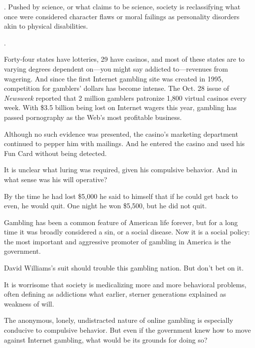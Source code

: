 \linefill. Pushed by science, or what claims to be science,
society is reclassifying what once were considered character flaws or
moral failings as personality disorders akin to physical disabilities.

\linefill.

Forty-four states have lotteries, 29 have casinos, and most of these
states are to varying degrees dependent on---you might say addicted
to---revenues from wagering. And since the first Internet gambling site
was created in 1995, competition for gamblers' dollars has become
intense. The Oct. 28 issue of \emph{Newsweek} reported that 2 million
gamblers patronize 1,800 virtual casinos every week. With \$3.5
billion being lost on Internet wagers this year, gambling has passed
pornography as the Web's most profitable business.
\begin{listmatch}
	\item
Although no such evidence was presented, the casino's marketing
department continued to pepper him with mailings. And he entered the
casino and used his Fun Card without being detected.


\item 
It is unclear what luring was required, given his compulsive
behavior. And in what sense was his will operative?


\item 
By the time he had lost \$5,000 he said to himself that if he
could get back to even, he would quit. One night he won \$5,500, but he
did not quit.


\item 
 Gambling has been a common feature of American life forever, but
for a long time it was broadly considered a sin, or a social disease.
Now it is a social policy: the most important and aggressive promoter of
gambling in America is the government.


\item 
David Williams's suit should trouble this gambling nation. But
don't bet on it.


\item 
 It is worrisome that society is medicalizing more and more
behavioral problems, often defining as addictions what earlier, sterner
generations explained as weakness of will.


\item 
The anonymous, lonely, undistracted nature of online gambling is
especially conducive to compulsive behavior. But even if the government
knew how to move against Internet gambling, what would be its grounds
for doing so?

\end{listmatch}




